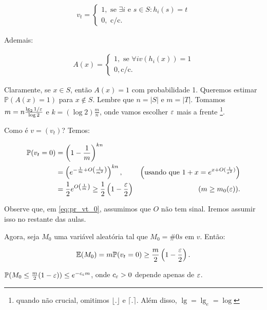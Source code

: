 \begin{align*}
  v_{t}=\begin{cases}
    1, \text{ se } \exists i \text{ e } s \in S : h_{i}(s)=t \\
    0, \text{ c/c. }
  \end{cases}
\end{align*}

Ademais:

\begin{align*}
  A(x)=\begin{cases}
    1, \text{ se } \forall i v(h_{i}(x))=1\\
    0, \text{c/c.}
  \end{cases}
\end{align*}

Claramente, se $x \in S$, então $A(x)=1$ com probabilidade 1. Queremos
estimar $\mathbb{P}(A(x)=1)$ para $x \notin S$. Lembre que $n=|S|$ e
$m=|T|$. Tomamos $m=n\frac{\lg_{2} 1/\varepsilon}{\log 2}$ e $k=(\log 2)\frac{m}{n}$,
onde vamos escolher $\varepsilon$ mais a frente \footnote{quando não crucial,
omitimos $\lfloor . \rfloor$ e $\lceil . \rceil$. Além disso,
$\lg=\lg_{e}=\log$}.

Como é $v=(v_{t})$? Temos:

\begin{align}
\mathbb{P}(v_{t}=0) &= \left(1-\frac{1}{m}\right)^{kn}\\
                    &= \left(e^{-\frac{1}{m}+O\left(\frac{1}{m^2}\right)}\right)^{kn} \label{eq:pr_vt_0}, & \left(\text{usando que } 1+x=e^{x+O(\frac{1}{x^2})}\right) \\
                    &= \frac{1}{2}e^{O\left(\frac{1}{m}\right)} \geq
                    \frac{1}{2}\left(1-\frac{\varepsilon}{2}\right) & (m \geq
                    m_{0}(\varepsilon)).
\end{align}

\begin{observacao}
Observe que, em \eqref{eq:pr_vt_0}, assumimos que $O$ não tem
sinal. Iremos assumir isso no restante das aulas.     
\end{observacao}

Agora, seja $M_{0}$
uma variável aleatória tal que $M_{0}=\#0s$ em $v$. Então:

$$
\mathbb{E}(M_{0})=m\mathbb{P}(v_{t}=0) \geq
\frac{m}{2}\left(1-\frac{\varepsilon}{2}\right).
$$

\begin{fato}
\label{fato:filtros_de_Bloom}
$\mathbb{P}(M_{0} \leq \frac{m}{2}(1-\varepsilon)) \leq e^{-c_{\varepsilon}m}$, onde $c_{\varepsilon} > 0$ depende apenas de $\varepsilon$.
\end{fato}

